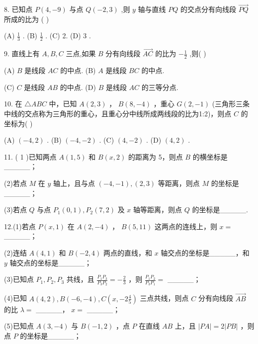 \documentclass[10pt]{article}
\begin{document}
8. 已知点 \(P\left( {4, - 9}\right)\) 与点 \(Q\left( {-2,3}\right)\) ,则 \(y\) 轴与直线 \({PQ}\) 的交点分有向线段 \(\overrightarrow{PQ}\) 所成的比为 ( )

(A) \(\frac{1}{3}\) . (B) \(\frac{1}{2}\) . (C) 2. (D) 3 .

9. 直线上有 \(A,B,C\) 三点,如果 \(B\) 分有向线段 \(\overrightarrow{AC}\) 的比为 \(- \frac{1}{2}\) ,则(   )

(A) \(B\) 是线段 \({AC}\) 的中点. (B) \(A\) 是线段 \({BC}\) 的中点.

(C) \(C\) 是线段 \({AB}\) 的中点. (D) \(B\) 是线段 \({AC}\) 的三等分点.

10. 在 \(\bigtriangleup  {ABC}\) 中，已知 \(A\left( {2,3}\right)\) ， \(B\left( {8, - 4}\right)\) ，重心 \(G\left( {2, - 1}\right)\) (三角形三条中线的交点称为三角形的重心，且重心分中线所成两线段的比为1:2)，则点 \(C\) 的坐标为( )

(A) \(\left( {-4,2}\right)\) . (B) \(\left( {-4, - 2}\right)\) . (C) \(\left( {4, - 2}\right)\) . (D) \(\left( {4,2}\right)\) .

11. ( 1 )已知两点 \(A\left( {1,5}\right)\) 和 \(B\left( {x,2}\right)\) 的距离为 5，则点 \(B\) 的横坐标是\_\_\_\_\_；

(2)若点 \(M\) 在 \(y\) 轴上，且与点 \(\left( {-4, - 1}\right) ,\left( {2,3}\right)\) 等距离，则点 \(M\) 的坐标是\_\_\_\_\_；

(3)若点 \(Q\) 与点 \({P}_{1}\left( {0,1}\right) ,{P}_{2}\left( {7,2}\right)\) 及 \(x\) 轴等距离，则点 \(Q\) 的坐标是\_\_\_\_\_.

12.(1)若点 \(P\left( {x,1}\right)\) 在 \(A\left( {2, - 4}\right)\) ， \(B\left( {5,{11}}\right)\) 这两点的连线上，则 \(x =\) \_\_\_\_\_；

(2)连结 \(A\left( {4,1}\right)\) 和 \(B\left( {-2,4}\right)\) 两点的直线，和 \(x\) 轴交点的坐标是\_\_\_\_\_，和 \(y\) 轴交点的坐标是\_\_\_\_\_；

(3)已知点 \({P}_{1},{P}_{2},{P}_{3}\) 共线，且 \(\frac{{P}_{1}{P}_{3}}{{P}_{3}{P}_{2}} =  - \frac{2}{3}\) ，则 \(\frac{{P}_{1}{P}_{2}}{{P}_{3}{P}_{1}} =\) \_\_\_\_\_；

(4)已知 \(A\left( {4,2}\right) ,B\left( {-6, - 4}\right) ,C\left( {x, - 2\frac{4}{5}}\right)\) 三点共线，则点 \(C\) 分有向线段 \(\overrightarrow{AB}\) 的比 \(\lambda  =\) \_\_\_\_\_， \(x =\) \_\_\_\_\_；

(5)已知点 \(A\left( {3, - 4}\right)\) 与 \(B\left( {-1,2}\right)\) ，点 \(P\) 在直线 \({AB}\) 上，且 \(\left| {PA}\right|  = 2\left| {PB}\right|\) ，则点 \(P\) 的坐标是\_\_\_\_\_；
\end{document}
